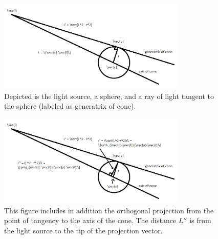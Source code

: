 \documentclass[10pt]{article}
\begin{document}
\begin{appendices}
\begin{figure}[h]
    \centering
    \includegraphics[width=0.8\textwidth]{sphere_shadow_figure_1.png}
    \caption{Depicted is the light source, a sphere, and a ray of light tangent to the sphere (labeled as generatrix of cone).}
    \label{fig:shadow_1}
\end{figure}

\begin{figure}[h]
    \centering
    \includegraphics[width=0.8\textwidth]{sphere_shadow_figure_2.png}
    \caption{This figure includes in addition the orthogonal projection from the point of tangency to the axis of the cone. The distance $L''$ is from the light source to the tip of the projection vector.}
    \label{fig:shadow_2}
\end{figure}



\end{appendices}
\end{document}
